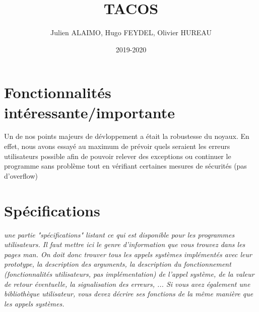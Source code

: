 \documentclass{article}
\title{TACOS}
\author{Julien ALAIMO, Hugo FEYDEL, Olivier HUREAU }
\date{2019-2020}
\begin{document}
\maketitle

\section{Fonctionnalités intéressante/importante}

\vspace{5mm}


Un de nos points majeurs de dévloppement a était la robustesse du noyaux. En effet, nous avons essayé au maximum de prévoir quels seraient les erreurs utilisateurs possible afin de pouvoir relever des exceptions ou continuer le programme sans problème tout en vérifiant certaines mesures de sécurités (pas d'overflow)

\section{Spécifications}

\textit{
une partie "spécifications" listant ce qui est disponible pour les programmes utilisateurs. Il faut mettre ici le genre d'information que vous trouvez dans les pages man. On doit donc trouver tous les appels systèmes implémentés avec leur prototype, la description des arguments, la description du fonctionnement (fonctionnalités utilisateurs, pas implémentation) de l'appel système, de la valeur de retour éventuelle, la signalisation des erreurs, ... Si vous avez également une bibliothèque utilisateur, vous devez décrire ses fonctions de la même manière que les appels systèmes.
}
\end{document}
